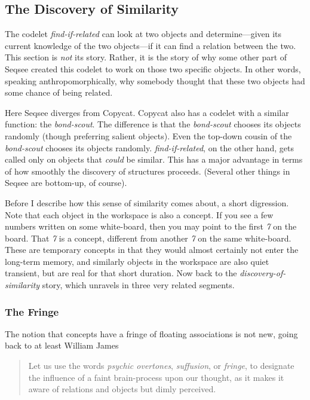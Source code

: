\documentclass[letterpaper]{article}
\begin{document}
\subsection{The Discovery of Similarity}

The codelet \emph{find-if-related} can look at two objects and determine---given its current knowledge of the two objects---if it can find a relation between the two.  This section is \emph{not} its story.  Rather, it is the story of why some other part of Seqsee created this codelet to work on those two specific objects.  In other words, speaking anthropomorphically, why somebody thought that these two objects had some chance of being related.

Here Seqsee diverges from Copycat.  Copycat also has a codelet with a similar function: the \emph{bond-scout}.  The difference is that the \emph{bond-scout} chooses its objects randomly (though preferring salient objects).  Even the top-down cousin of the \emph{bond-scout} chooses its objects randomly.  \emph{find-if-related}, on the other hand, gets called only on objects that \emph{could} be similar.  This has a major advantage in terms of how smoothly the discovery of structures proceeds.  (Several other things in Seqsee are bottom-up, of course).

Before I describe how this sense of similarity comes about, a short digression. Note that each object in the workspace is also a concept.  If you see a few numbers written on some white-board, then you may point to the first \emph{7} on the board.  That \emph{7} is a concept, different from another \emph{7} on the same white-board.  These are temporary concepts in that they would almost certainly not enter the long-term memory, and similarly objects in the workspace are also quiet transient, but are real for that short duration. Now back to the \emph{discovery-of-similarity} story, which unravels in three very related segments.

\subsubsection{The Fringe}
\label{sec:fringe}

The notion that concepts have a fringe of floating associations is not new, going back to at least William James \cite{James}

\begin{quote}
  Let us use the words \emph{psychic overtones}, \emph{suffusion}, or \emph{fringe}, to designate the influence of a faint brain-process upon our thought, as it makes it aware of relations and objects but dimly perceived.
\end{quote}
\end{document}
